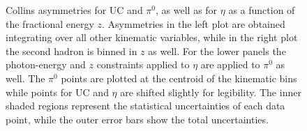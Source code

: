 \begin{figure}[H]
  \centering     
\caption[Collins asymmetries for UC and $\pi^0$, as well as for $\eta$ as a function of $z_{1}$]{Collins asymmetries for UC and $\pi^0$, as well as for $\eta$ as a function of the fractional energy $z$. 
Asymmetries in the left plot are obtained integrating over all other kinematic variables, while in the right plot the second hadron is binned in \(z\) as well.
For the lower panels the photon-energy and $z$ constraints applied to $\eta$ are applied to $\pi^0$ as well. 
The $\pi^0$ points are plotted at the centroid of the kinematic bins while points for UC and $\eta$ are shifted slightly for legibility. 
The inner shaded regions represent the statistical uncertainties of each data point, while the outer error bars show the total uncertainties.}
\label{fig:finalasymmetry2}
\end{figure}

